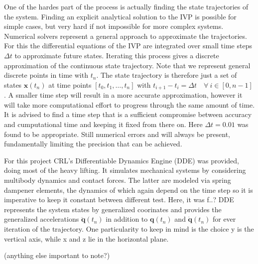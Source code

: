 One of the hardes part of the process is actually finding the state trajectories of the system. 
Finding an explicit analytical solution to the IVP is possible for simple cases, but very hard if not impossible for more complex systems. Numerical solvers represent a general approach to approximate the trajectories. For this the differential equations of the IVP are integrated over small time steps $\Delta t$ to approximate future states. Iterating this process gives a discrete approximation of the continuous state trajectory. Note that we represent general discrete points in time with $t_n$.
The state trajectory is therefore just a set of states $\mathbf{x}(t_n)$ at time points $[t_0,t_1,\ldots, t_n]$ with $t_{i+1}-t_{i} = \Delta t\quad \forall\ i \in [0,n-1]\ $.
A smaller time step will result in a more accurate approximation, however it will take more computational effort to progress through the same amount of time.
It is advised to find a time step that is a sufficient compromise between accuracy and cumputational time and keeping it fixed from there on. Here $\Delta t = 0.01$ was found to be appropriate. 
Still numerical errors and will always be present, fundamentally limiting the precision that can be achieved. 

For this project CRL's Differentiable Dynamics Engine (DDE) was provided, doing most of the heavy lifting. It simulates mechanical systems by considering multibody dynamics and contact forces. The latter are modeled via spring dampener elements, the dynamics of which again depend on the time step so it is imperative to keep it constant between different test. Here, it was f..?
DDE represents the system states by generalized coorinates and provides the generalized accelerations $\ddot{\mathbf{q}}(t_n)$ in addition to $\mathbf{q}(t_n)$ and $\dot{\mathbf{q}}(t_n)$ for ever iteration of the trajectory. One particularity to keep in mind is the choice y is the vertical axis, while x and z lie in the horizontal plane. 

(anything else important to note?)




